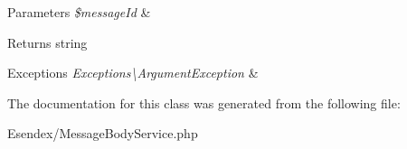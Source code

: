 \begin{DoxyParams}{Parameters}
{\em \$message\-Id} & \\
\hline
\end{DoxyParams}
\begin{DoxyReturn}{Returns}
string 
\end{DoxyReturn}

\begin{DoxyExceptions}{Exceptions}
{\em Exceptions\textbackslash{}\-Argument\-Exception} & \\
\hline
\end{DoxyExceptions}


The documentation for this class was generated from the following file\-:\begin{DoxyCompactItemize}
\item 
Esendex/Message\-Body\-Service.\-php\end{DoxyCompactItemize}
